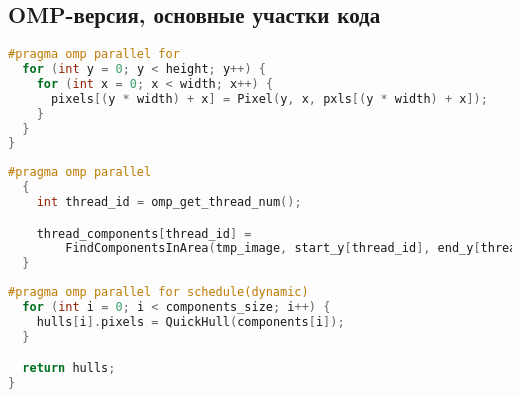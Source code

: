 \documentclass[12pt]{article}
\begin{document}
\subsection{OMP-версия, основные участки кода}
\label{appendix:omp_1}
\begin{lstlisting}[language=C++, caption={OMP-версия, Создание объекта Image в конструкторе Image::Image()}]
#pragma omp parallel for
  for (int y = 0; y < height; y++) {
    for (int x = 0; x < width; x++) {
      pixels[(y * width) + x] = Pixel(y, x, pxls[(y * width) + x]);
    }
  }
}
\end{lstlisting}
\label{appendix:omp_2}
\begin{lstlisting}[language=C++, caption={OMP-версия, Поиск компонент по "полосам" изображения в функции FindComponentsOMP()}]
#pragma omp parallel
  {
    int thread_id = omp_get_thread_num();

    thread_components[thread_id] =
        FindComponentsInArea(tmp_image, start_y[thread_id], end_y[thread_id], index_offset[thread_id]);
  }
\end{lstlisting}
\label{appendix:omp_3}
\begin{lstlisting}[language=C++, caption={OMP-версия, Построение оболочки для каждой из компонент в функции QuickHullAllOMP()}]
#pragma omp parallel for schedule(dynamic)
  for (int i = 0; i < components_size; i++) {
    hulls[i].pixels = QuickHull(components[i]);
  }

  return hulls;
}
\end{lstlisting}

\newpage
\end{document}
